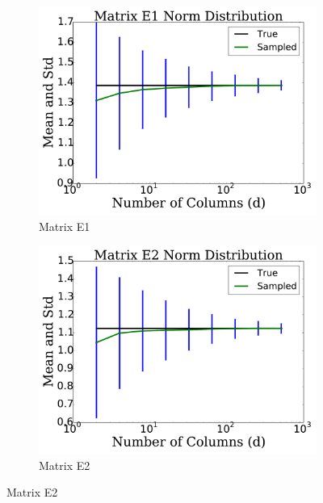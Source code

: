 \begin{figure}[p]
    \begin{subfigure}{0.45\textwidth}
    \includegraphics[width=\textwidth]{plots/mat_E1_error_test.pdf}
    \caption{Matrix E1}
    \end{subfigure}
    \begin{subfigure}{0.45\textwidth}
    \includegraphics[width=\textwidth]{plots/mat_E2_error_test.pdf}
    \caption{Matrix E2}
    \end{subfigure}


\end{figure}
